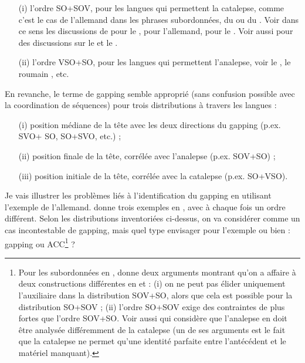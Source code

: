 \begin{itemize}
\item[(i)] l’ordre SO+SOV, pour les langues qui permettent la catalepse, comme c’est le cas de l’allemand dans les phrases subordonnées, du  ou du . Voir dans ce sens les discussions de \citet{Lee2005} pour le , \citet{Osborne2006} pour l’allemand, \citet{Yosuke2009} pour le . Voir aussi \citet{Kazenin2001} pour des discussions sur le  et le .

\item[(ii)] l’ordre VSO+SO, pour les langues qui permettent l’analepse, voir le  \citep{Kazenin2001}, le roumain \citep{Bilbiie2010}, etc.  
\end{itemize}

En revanche, le terme de gapping semble approprié (sans confusion possible avec la coordination de séquences) pour trois distributions à travers les langues : 

\begin{itemize}
 \item[(i)] position médiane de la tête avec les deux directions du gapping (p.ex. SVO+ SO, SO+SVO, etc.) ; 
\item[(ii)] position finale de la tête, corrélée avec l’analepse (p.ex. SOV+SO) ;
\item[(iii)] position initiale de la tête, corrélée avec la catalepse (p.ex. SO+VSO).
\end{itemize}

 \newpage
Je vais illustrer les problèmes liés à l’identification du gapping en utilisant l’exemple de l’allemand. \citet{Haspelmath2007} donne trois exemples en , avec à chaque fois un ordre différent. Selon les distributions inventoriées ci-dessus, on va considérer  comme un cas incontestable de gapping, mais quel type envisager pour l’exemple  ou bien  : gapping ou ACC\footnote{
Pour les subordonnées en , \citet{Maling1972} donne deux arguments montrant qu’on a affaire à deux constructions différentes en  et  : (i) on ne peut pas élider uniquement l’auxiliaire dans la distribution SOV+SO, alors que cela est possible pour la distribution SO+SOV ; (ii) l’ordre SO+SOV exige des contraintes de  plus fortes que l’ordre SOV+SO. Voir aussi \citet{Ince2009} qui considère que l’analepse en  doit être analysée différemment de la catalepse (un de ses arguments est le fait que la catalepse ne permet qu’une identité parfaite entre l’antécédent et le matériel manquant).} ?

